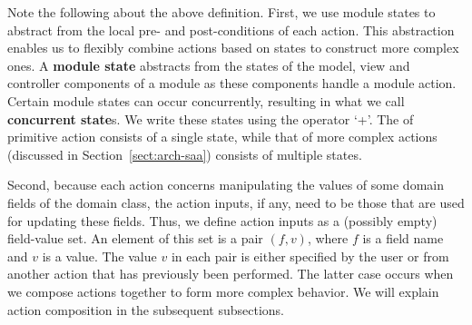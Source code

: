 Note the following about the above definition. 
First, we use module states to abstract from the local pre- and post-conditions of each action. This abstraction enables us to flexibly combine actions based on states to construct more complex ones. A \textbf{module state} abstracts from the states of the model, view and controller components of a module as these components handle a module action. Certain module states can occur concurrently, resulting in what we call \textbf{concurrent state}s. We write these states using the operator `+'. 
The  of primitive action consists of a single state, while that of more complex actions (discussed in Section~\ref{sect:arch-saa}) consists of multiple states.

Second, because each action concerns manipulating the values of some domain fields of the domain class, the action inputs, if any, need to be those that are used for updating these fields. Thus, we define action inputs as a (possibly empty) field-value set. An element of this set is a pair $(f,v)$, where $f$ is a field name and $v$ is a value. The value $v$ in each pair is either specified by the user or from another action that has previously been performed. The latter case occurs when we compose actions together to form more complex behavior. We will explain action composition in the subsequent subsections.

